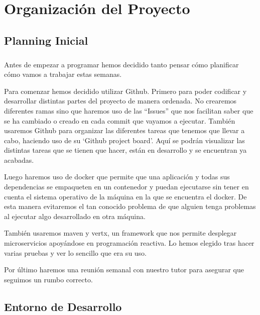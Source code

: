\chapter{Organización del Proyecto}

\paragraph{}
\section{Planning Inicial}
\paragraph{}
Antes de empezar a programar hemos decidido tanto pensar cómo planificar cómo vamos a trabajar estas semanas.

Para comenzar hemos decidido utilizar Github. Primero para poder codificar y desarrollar distintas partes del proyecto de manera ordenada. No crearemos diferentes ramas sino que haremos uso de las “Issues” que nos facilitan saber que se ha cambiado o creado en cada commit que vayamos a ejecutar. También usaremos Github para organizar las diferentes tareas que tenemos que llevar a cabo, haciendo uso de su ‘Github project board’. Aquí se podrán visualizar las distintas tareas que se tienen que hacer, están en desarrollo y se encuentran ya acabadas.

Luego haremos uso de docker que permite que una aplicación y todas sus dependencias se empaqueten en un contenedor y puedan ejecutarse sin tener en cuenta el sistema operativo de la máquina en la que se encuentra el docker. De esta manera evitaremos el tan conocido problema de que alguien tenga problemas al ejecutar algo desarrollado en otra máquina.

También usaremos maven y vertx, un framework  que nos permite desplegar microservicios apoyándose en programación reactiva. Lo hemos elegido tras hacer varias pruebas y ver lo sencillo que era su uso.

Por último haremos una reunión semanal con nuestro tutor para asegurar que seguimos un rumbo correcto.

\section{Entorno de Desarrollo}
\paragraph{}

